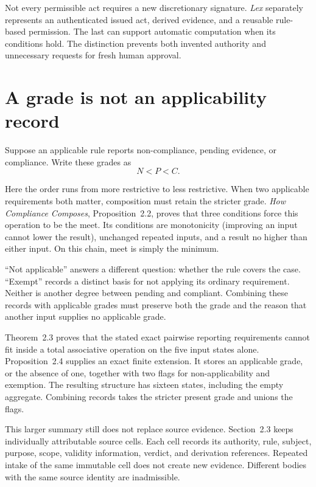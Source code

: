 \documentclass{momentum}
\begin{document}
Not every permissible act requires a new discretionary signature. \emph{Lex} separately represents an authenticated issued act, derived evidence, and a reusable rule-based permission. The last can support automatic computation when its conditions hold. The distinction prevents both invented authority and unnecessary requests for fresh human approval. \cite[Sections~4.6--4.7]{lex}

\section{A grade is not an applicability record}

Suppose an applicable rule reports non-compliance, pending evidence, or compliance. Write these grades as
\[
N < P < C.
\]

Here the order runs from more restrictive to less restrictive. When two applicable requirements both matter, composition must retain the stricter grade. \emph{How Compliance Composes}, Proposition~2.2, proves that three conditions force this operation to be the meet. Its conditions are monotonicity (improving an input cannot lower the result), unchanged repeated inputs, and a result no higher than either input. On this chain, meet is simply the minimum.

``Not applicable'' answers a different question: whether the rule covers the case. ``Exempt'' records a distinct basis for not applying its ordinary requirement. Neither is another degree between pending and compliant. Combining these records with applicable grades must preserve both the grade and the reason that another input supplies no applicable grade.

Theorem~2.3 proves that the stated exact pairwise reporting requirements cannot fit inside a total associative operation on the five input states alone. Proposition~2.4 supplies an exact finite extension. It stores an applicable grade, or the absence of one, together with two flags for non-applicability and exemption. The resulting structure has sixteen states, including the empty aggregate. Combining records takes the stricter present grade and unions the flags. \cite[Section~2.2]{composes}

This larger summary still does not replace source evidence. Section~2.3 keeps individually attributable source cells. Each cell records its authority, rule, subject, purpose, scope, validity information, verdict, and derivation references. Repeated intake of the same immutable cell does not create new evidence. Different bodies with the same source identity are inadmissible. \cite[Definition~2.5 and Proposition~2.6]{composes}
\end{document}
